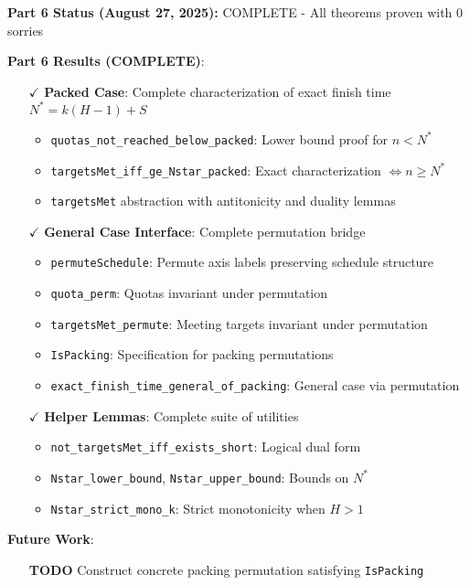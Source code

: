 \documentclass[11pt]{article}
\theoremstyle{definition}
\theoremstyle{remark}
\begin{document}
\begin{mdframed}[style=status]
\textbf{Part 6 Status (August 27, 2025):} COMPLETE - All theorems proven with 0 sorries
\end{mdframed}

\textbf{Part 6 Results (COMPLETE)}:
\begin{itemize}
\item[$\checkmark$] \textbf{Packed Case}: Complete characterization of exact finish time $N^* = k(H-1) + S$
  \begin{itemize}
  \item \texttt{quotas\_not\_reached\_below\_packed}: Lower bound proof for $n < N^*$
  \item \texttt{targetsMet\_iff\_ge\_Nstar\_packed}: Exact characterization $\Leftrightarrow n \geq N^*$
  \item \texttt{targetsMet} abstraction with antitonicity and duality lemmas
  \end{itemize}
\item[$\checkmark$] \textbf{General Case Interface}: Complete permutation bridge
  \begin{itemize}
  \item \texttt{permuteSchedule}: Permute axis labels preserving schedule structure
  \item \texttt{quota\_perm}: Quotas invariant under permutation
  \item \texttt{targetsMet\_permute}: Meeting targets invariant under permutation
  \item \texttt{IsPacking}: Specification for packing permutations
  \item \texttt{exact\_finish\_time\_general\_of\_packing}: General case via permutation
  \end{itemize}
\item[$\checkmark$] \textbf{Helper Lemmas}: Complete suite of utilities
  \begin{itemize}
  \item \texttt{not\_targetsMet\_iff\_exists\_short}: Logical dual form
  \item \texttt{Nstar\_lower\_bound}, \texttt{Nstar\_upper\_bound}: Bounds on $N^*$
  \item \texttt{Nstar\_strict\_mono\_k}: Strict monotonicity when $H > 1$
  \end{itemize}
\end{itemize}

\textbf{Future Work}:
\begin{itemize}
\item[\textbf{TODO}] Construct concrete packing permutation satisfying \texttt{IsPacking}
\end{itemize}
\end{document}
